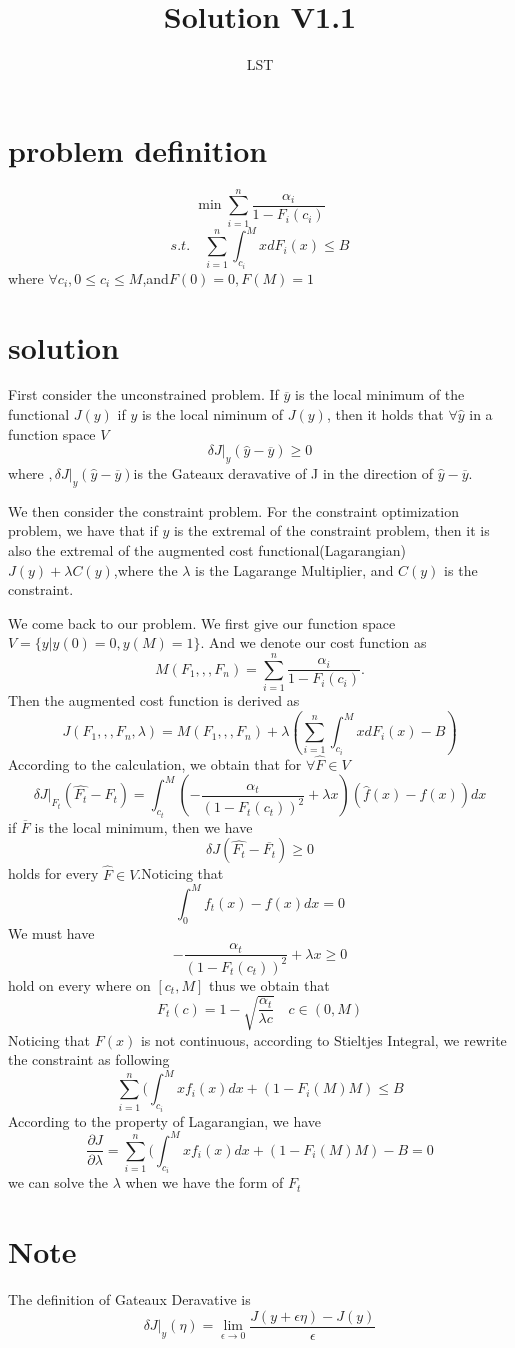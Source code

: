 \documentclass{article}
\begin{document}
\title{Solution V1.1}
\author{LST}
\maketitle
\section{problem definition}
\[\min \sum_{i=1}^n \frac{\alpha_i}{1-F_i(c_i)}\]
\[s.t. \quad \sum_{i=1}^n\int_{c_i}^MxdF_i(x)\leq B\]
where $\forall c_i,0\leq c_i\leq M$,and$F(0)=0,F(M)=1$
\section{solution}
First consider the unconstrained problem. If $\overline{y}$ is the local minimum of the functional $J(y)$
if $y$ is the local niminum of $J(y)$, then it holds that $\forall \hat{y}$ in a function space $V$
\[\delta J|_y(\hat{y}-\overline{y})\geq 0\]
where $,\delta J|_y(\hat{y}-\overline{y})$is the Gateaux deravative of J in the direction of $\hat{y}-\overline{y}$. 

We then consider the constraint problem. For the constraint optimization problem, we have that if $y$ is the extremal of the constraint problem, then it is also the extremal of the augmented cost functional(Lagarangian) $J(y)+\lambda C(y)$,where the $\lambda$ is the Lagarange Multiplier, and $C(y)$ is the constraint.

We come back to our problem. We first give our function space $V=\{y|y(0)=0,y(M)=1\}$. And we denote our cost function as
\[M(F_1,,,F_n)= \sum_{i=1}^n \frac{\alpha_i}{1-F_i(c_i)}.\]
Then the augmented cost function is derived as
\[J(F_1,,,F_n,\lambda)=M(F_1,,,F_n)+\lambda( \sum_{i=1}^n\int_{c_i}^MxdF_i(x)-B) \]
According to the calculation, we obtain that for $\forall \hat{F}\in V$
\[\delta J|_{F_t}(\hat{F_t}-F_t)=\int_{c_t}^M(-\frac{\alpha_t}{(1-F_t(c_t))^2}+\lambda x)(\hat{f}(x)-f(x))dx\]
if $\overline{F}$ is the local minimum, then we have
\[\delta J(\hat{F_t}-\overline{F_t})\geq 0\]
holds for every $\hat{F}\in V$.Noticing that
\[\int_0^Mf_t(x)-f(x)dx=0\]
We must have 
\[-\frac{\alpha_t}{(1-F_t(c_t))^2}+\lambda x\geq 0\]
hold on every where on $[c_t,M]$
thus we obtain that
\[F_t(c)=1-\sqrt{\frac{\alpha_t}{\lambda c}}\quad c\in(0,M)\]
Noticing that $F(x)$ is not continuous, according to Stieltjes Integral, we rewrite the constraint as following
\[ \sum_{i=1}^n(\int_{c_i}^Mxf_i(x)dx+(1-F_i(M)M)\leq B\]
According to the property of Lagarangian, we have
\[\frac{\partial J}{\partial \lambda}=\sum_{i=1}^n(\int_{c_i}^Mxf_i(x)dx+(1-F_i(M)M)-B=0\]
we can solve the $\lambda$ when we have the form of $F_t$
\section{Note}
The definition of Gateaux Deravative is 
\[\delta J|_y(\eta)=\lim_{\epsilon \to 0} \frac{J(y+\epsilon \eta)-J(y)}{\epsilon}\]
\end{document}
